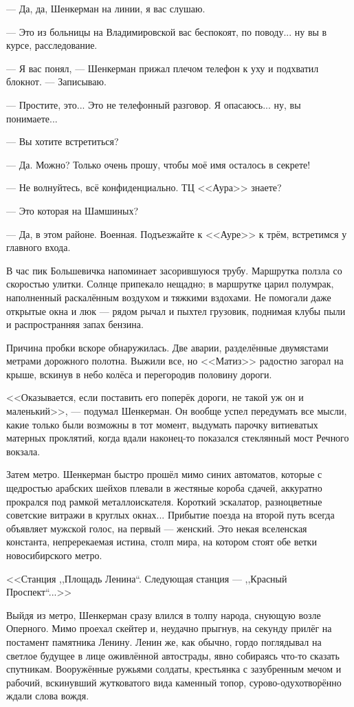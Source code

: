 --- Да, да, Шенкерман на линии, я вас слушаю.

--- Это из больницы на Владимировской вас беспокоят, по поводу... ну вы в курсе, расследование.

--- Я вас понял, --- Шенкерман прижал плечом телефон к уху и подхватил блокнот.
--- Записываю.

--- Простите, это...
Это не телефонный разговор.
Я опасаюсь... ну, вы понимаете...

--- Вы хотите встретиться?

--- Да.
Можно?
Только очень прошу, чтобы моё имя осталось в секрете!

--- Не волнуйтесь, всё конфиденциально.
ТЦ <<Аура>> знаете?

--- Это которая на Шамшиных?

--- Да, в этом районе.
Военная.
Подъезжайте к <<Ауре>> к трём, встретимся у главного входа.

\asterism

В час пик Большевичка напоминает засорившуюся трубу.
Маршрутка ползла со скоростью улитки.
Солнце припекало нещадно;
в маршрутке царил полумрак, наполненный раскалённым воздухом и тяжкими вздохами.
Не помогали даже открытые окна и люк --- рядом рычал и пыхтел грузовик, поднимая клубы пыли и распространняя запах бензина.

Причина пробки вскоре обнаружилась.
Две аварии, разделённые двумястами метрами дорожного полотна.
Выжили все, но <<Матиз>> радостно загорал на крыше, вскинув в небо колёса и перегородив половину дороги.

<<Оказывается, если поставить его поперёк дороги, не такой уж он и маленький>>, --- подумал Шенкерман.
Он вообще успел передумать все мысли, какие только были возможны в тот момент, выдумать парочку витиеватых матерных проклятий, когда вдали наконец-то показался стеклянный мост Речного вокзала.

Затем метро.
Шенкерман быстро прошёл мимо синих автоматов, которые с щедростью арабских шейхов плевали в жестяные короба сдачей, аккуратно прокрался под рамкой металлоискателя.
Короткий эскалатор, разноцветные советские витражи в круглых окнах...
Прибытие поезда на второй путь всегда объявляет мужской голос, на первый --- женский.
Это некая вселенская константа, непререкаемая истина, столп мира, на котором стоят обе ветки новосибирского метро.

<<Станция ,,Площадь Ленина``. Следующая станция --- ,,Красный Проспект``...>>

Выйдя из метро, Шенкерман сразу влился в толпу народа, снующую возле Оперного.
Мимо проехал скейтер и, неудачно прыгнув, на секунду прилёг на постамент памятника Ленину.
Ленин же, как обычно, гордо поглядывал на светлое будущее в лице оживлённой автострады, явно собираясь что-то сказать спутникам.
Вооружённые ружьями солдаты, крестьянка с зазубренным мечом и рабочий, вскинувший жутковатого вида каменный топор, сурово-одухотворённо ждали слова вождя.

